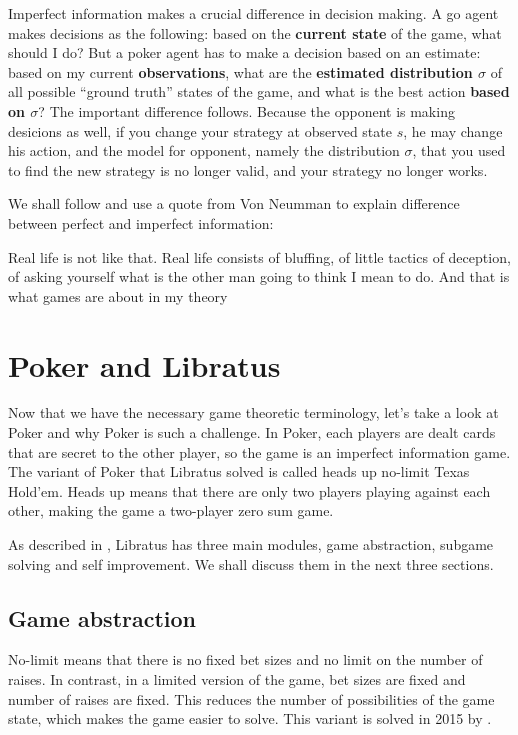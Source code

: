 \documentclass[10pt,a4paper]{article}
\begin{document}
Imperfect information makes a crucial difference in decision making. A go agent makes decisions as the following: based on the \textbf{current state} of the game, what should I do? But a poker agent has to make a decision based on an estimate: based on my current \textbf{observations}, what are the \textbf{estimated distribution $\sigma$} of all possible ``ground truth'' states of the game, and what is the best action \textbf{based on $\sigma$}? The important difference follows. Because the opponent is making desicions as well, if you change your strategy at observed state $s$, he may change his action, and the model for opponent, namely the distribution $\sigma$, that you used to find the new strategy is no longer valid, and your strategy no longer works.

We shall follow \cite{bowling2015heads} and use a quote from Von Neumman to explain difference between perfect and imperfect information:

\begin{displayquote}
	Real life is not like that. Real life consists of bluffing, of little tactics of deception, of asking yourself what is the other man going to think I mean to do. And that is what games are about in my theory
\end{displayquote}

\newpage
\section{Poker and Libratus}
Now that we have the necessary game theoretic terminology, let's take a look at Poker and why Poker is such a challenge. In Poker, each players are dealt cards that are secret to the other player, so the game is an imperfect information game. The variant of Poker that Libratus solved is called heads up no-limit Texas Hold'em. Heads up means that there are only two players playing against each other, making the game a two-player zero sum game.

As described in \cite{brown2017superhuman}, Libratus has three main modules, game abstraction, subgame solving and self improvement. We shall discuss them in the next three sections.

\subsection{Game abstraction}
No-limit means that there is no fixed bet sizes and no limit on the number of raises. In contrast, in a limited version of the game, bet sizes are fixed and number of raises are fixed. This reduces the number of possibilities of the game state, which makes the game easier to solve. This variant is solved in 2015 by \cite{bowling2015heads}.
\end{document}
